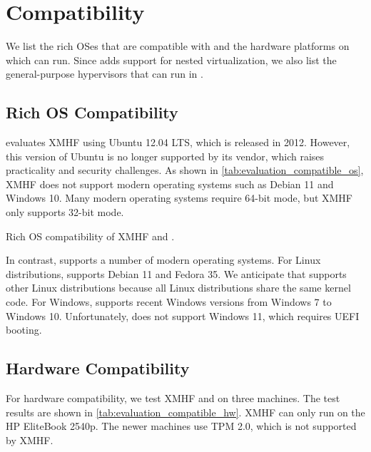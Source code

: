 \section{Compatibility}
\label{sec:evaluation_compatibility}

We list the rich OSes that are compatible with  and the hardware platforms on which  can run. Since  adds support for nested virtualization, we also list the general-purpose hypervisors that can run in .

\subsection{Rich OS Compatibility}

\cite{vasudevan2013design} evaluates XMHF using Ubuntu 12.04 LTS, which is released in 2012. However, this version of Ubuntu is no longer supported by its vendor, which raises practicality and security challenges. As shown in \ref{tab:evaluation_compatible_os}, XMHF does not support modern operating systems such as Debian 11 and Windows 10. Many modern operating systems require 64-bit mode, but XMHF only supports 32-bit mode.

\begin{table}[tbp]
	\begin{center}
	
	\caption{Rich OS compatibility of XMHF and .}
	\label{tab:evaluation_compatible_os}
	\end{center}
\end{table}

In contrast,  supports a number of modern operating systems. For Linux distributions,  supports Debian 11 and Fedora 35. We anticipate that  supports other Linux distributions because all Linux distributions share the same kernel code. For Windows,  supports recent Windows versions from Windows 7 to Windows 10. Unfortunately,  does not support Windows 11, which requires UEFI booting.

\subsection{Hardware Compatibility}

For hardware compatibility, we test XMHF and  on three machines. The test results are shown in \ref{tab:evaluation_compatible_hw}. XMHF can only run on the HP EliteBook 2540p. The newer machines use TPM 2.0, which is not supported by XMHF.

